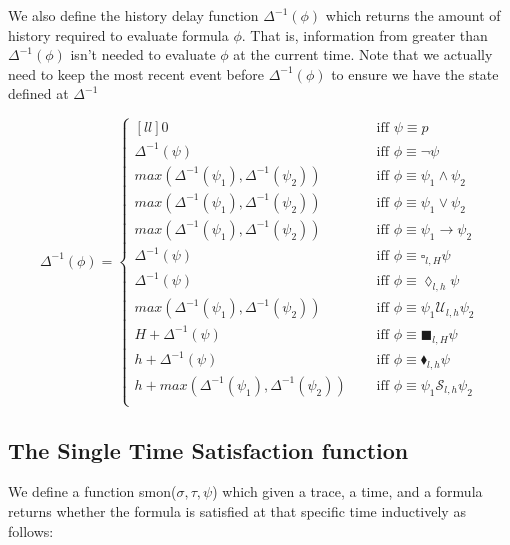 \documentclass[10pt,a4paper]{article}
\begin{document}
We also define the history delay function $\Delta^{-1}(\phi)$ which returns the amount of history required to evaluate formula $\phi$. That is, information from greater than $\Delta^{-1}(\phi)$ isn't needed to evaluate $\phi$ at the current time. Note that we actually need to keep the most recent event before $\Delta^{-1}(\phi)$ to ensure we have the state defined at $\Delta^{-1}$

\[
\Delta^{-1}(\phi) = \left\lbrace
\begin{aligned}[l l]
0 & \quad \text{ iff } \psi \equiv p \\
\Delta^{-1}(\psi) & \quad \text{ iff } \phi \equiv \neg \psi \\
max(\Delta^{-1}(\psi_1),\Delta^{-1}(\psi_2)) & \quad \text{ iff } \phi \equiv \psi_1 \wedge \psi_2 \\
max(\Delta^{-1}(\psi_1),\Delta^{-1}(\psi_2)) & \quad \text{ iff } \phi \equiv \psi_1 \vee \psi_2 \\
max(\Delta^{-1}(\psi_1),\Delta^{-1}(\psi_2)) & \quad \text{ iff } \phi \equiv \psi_1 \rightarrow \psi_2 \\
\Delta^{-1}(\psi) & \quad \text{ iff } \phi \equiv \square_{l,H} \psi \\
\Delta^{-1}(\psi) & \quad \text{ iff } \phi \equiv \lozenge_{l,h} \psi \\
max(\Delta^{-1}(\psi_1),\Delta^{-1}(\psi_2)) & \quad \text{ iff } \phi \equiv \psi_1 \mathcal{U}_{l,h} \psi_2 \\
H + \Delta^{-1}(\psi) & \quad \text{ iff } \phi \equiv \blacksquare_{l,H} \psi \\
h + \Delta^{-1}(\psi) & \quad \text{ iff } \phi \equiv \blacklozenge_{l,h} \psi \\
h + max(\Delta^{-1}(\psi_1),\Delta^{-1}(\psi_2)) & \quad \text{ iff } \phi \equiv \psi_1 \mathcal{S}_{l,h} \psi_2 \\
\end{aligned} \right. \]

%
%


\subsection{The Single Time Satisfaction function}
We define a function smon($\sigma, \tau, \psi$) which given a trace, a time, and a formula returns whether the formula is satisfied at that specific time inductively as follows:
\end{document}
